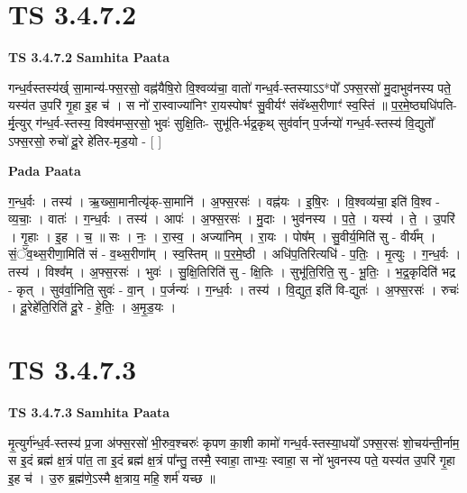 \documentclass[17pt]{extarticle}
\begin{document}
\section*{ TS 3.4.7.2 }

\textbf{TS 3.4.7.2 } \newline
\textbf{Samhita Paata} \newline

गन्ध॒र्वस्तस्य॑र्ख् सा॒मान्य॑-फ्स॒रसो॒ वह्न॑यैषि॒रो वि॒श्वव्य॑चा॒ वातो॑ गन्ध॒र्व-स्तस्याऽऽ*पो᳚ ऽफ्स॒रसो॑ मु॒दाभुव॑नस्य पते॒ यस्य॑त उ॒परि॑ गृ॒हा इ॒ह च॑ । स नो॑ रा॒स्वाज्या॑निꣳ रा॒यस्पोषꣳ॑ सु॒वीर्यꣳ॑ संवॅथ्स॒रीणाꣳ॑ स्व॒स्तिं ॥ प॒र॒मे॒ष्ठ्यधि॑पति-र्मृ॒त्युर् ग॑न्ध॒र्व-स्तस्य॒ विश्व॑मप्स॒रसो॒ भुवः॑ सुक्षि॒तिः- सुभू॑ति-र्भद्र॒कृथ् सुव॑र्वान् प॒र्जन्यो॑ गन्ध॒र्व-स्तस्य॑ वि॒द्युतो᳚ ऽफ्स॒रसो॒ रुचो॑ दू॒रे हे॑तिर-मृड॒यो - [  ] \newline

\textbf{Pada Paata} \newline

ग॒न्ध॒र्वः । तस्य॑ । ऋ॒ख्सा॒मानीत्यृ॑क्-सा॒मानि॑ । अ॒फ्स॒रसः॑ । वह्न॑यः । इ॒षि॒रः । वि॒श्वव्य॑चा॒ इति॑ वि॒श्व - व्य॒चाः॒ । वातः॑ । ग॒न्ध॒र्वः । तस्य॑ । आपः॑ । अ॒फ्स॒रसः॑ । मु॒दाः । भुव॑नस्य । प॒ते॒ । यस्य॑ । ते॒ । उ॒परि॑ । गृ॒हाः । इ॒ह । च॒ ॥ सः । नः॒ । रा॒स्व॒ । अज्या॑निम् । रा॒यः । पोष᳚म् । सु॒वीर्य॒मिति॑ सु - वीर्य᳚म् । सं॒ॅव॒थ्स॒रीणा॒मिति॑ सं - व॒थ्स॒रीणा᳚म् । स्व॒स्तिम् ॥ प॒र॒मे॒ष्ठी । अधि॑प॒तिरित्यधि॑ - प॒तिः॒ । मृ॒त्युः । ग॒न्ध॒र्वः । तस्य॑ । विश्व᳚म् । अ॒फ्स॒रसः॑ । भुवः॑ । सु॒क्षि॒तिरिति॑ सु - क्षि॒तिः । सुभू॑ति॒रिति॒ सु - भू॒तिः॒ । भ॒द्र॒कृदिति॑ भद्र - कृत् । सुव॑र्वा॒निति॒ सुवः॑ - वा॒न् । प॒र्जन्यः॑ । ग॒न्ध॒र्वः । तस्य॑ । वि॒द्युत॒ इति॑ वि-द्युतः॑ । अ॒फ्स॒रसः॑ । रुचः॑ । दू॒रेहे॑ति॒रिति॑ दू॒रे - हे॒तिः॒ । अ॒मृ॒ड॒यः ।  \newline




\section*{ TS 3.4.7.3 }

\textbf{TS 3.4.7.3 } \newline
\textbf{Samhita Paata} \newline

मृ॒त्युर्ग॑न्ध॒र्व-स्तस्य॑ प्र॒जा अ॑फ्स॒रसो॑ भी॒रुव॒श्चरुः॑ कृपण का॒शी कामो॑ गन्ध॒र्व-स्तस्या॒धयो᳚ ऽफ्स॒रसः॑ शो॒चय॑न्ती॒र्नाम॒ स इ॒दं ब्रह्म॑ क्ष॒त्रं पा॑त॒ ता इ॒दं ब्रह्म॑ क्ष॒त्रं पा᳚न्तु॒ तस्मै॒ स्वाहा॒ ताभ्यः॒ स्वाहा॒ स नो॑ भुवनस्य पते॒ यस्य॑त उ॒परि॑ गृ॒हा इ॒ह च॑ । उ॒रु ब्र॒ह्म॑णे॒ऽस्मै क्ष॒त्राय॒ महि॒ शर्म॑ यच्छ ॥ \newline
\end{document}
